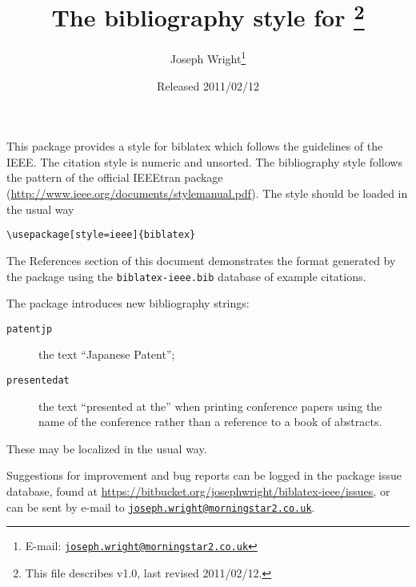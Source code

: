 \documentclass[a4paper]{article}
\author{Joseph Wright\thanks{E-mail: 
  \href{mailto:joseph.wright@morningstar2.co.uk}
  {\texttt{joseph.wright@morningstar2.co.uk}}}}
\title{The \pkg{ieee} bibliography style for \pkg{biblatex}%
  \footnote{This file describes v1.0, last revised 2011/02/12.}}
\date{Released 2011/02/12}
\providecommand*\pkg[1]{\textsf{#1}}
\begin{document}
\maketitle

This package provides a style for \pkg{biblatex} which follows the
guidelines of the IEEE. The citation style is numeric and unsorted. The
bibliography style follows the pattern of the official \pkg{IEEEtran}
package (\url{http://www.ieee.org/documents/stylemanual.pdf}). The style
should be loaded in the usual way
\begin{verbatim}
\usepackage[style=ieee]{biblatex}
\end{verbatim}
The References section of this document demonstrates the format 
generated by the package using the \texttt{biblatex-ieee.bib} database
of example citations.

The package introduces new bibliography strings:
\begin{description}
  \item[\texttt{patentjp}] the text \enquote{Japanese Patent};
  \item[\texttt{presentedat}] the text \enquote{presented at the} when 
    printing conference papers using the name of the conference rather 
    than a reference to a book of abstracts.
\end{description}
These may be localized in the usual way.

Suggestions for improvement and bug reports can be logged in the package
issue database, found at
\url{https://bitbucket.org/josephwright/biblatex-ieee/issues}, or can
be sent by e-mail to 
\href{mailto:joseph.wright@morningstar2.co.uk}
  {\texttt{joseph.wright@morningstar2.co.uk}}.

\nocite{*}

\printbibliography
\end{document}
